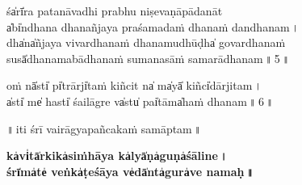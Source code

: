 \documentclass[parskip, DIV=14]{scrartcl}
\begin{document}
śa̍rī̍ra patanāva॒dhi pra॒bhu॒ ni॒ṣeva॒ṇāpā॒da॒nāt\\
a̍bi̍ndhana dhanañja॒ya pra॒śama॒daṁ dha॒naṁ dandhana॒m\,। \\
dha̍na̍ñjaya vivardha॒naṁ dha॒na॒mu॒dhūḍha̍ go॒vardha॒naṁ \\
su॒sā̍dhanamabādha॒naṁ su॒ma॒na॒sāṁ samarādhana॒m\,॥\,5\,॥ \par 

\newpage 
oṁ nā̍sti̍ pi̍trārji̍taṁ ki॒ñcit na̍ ma̍yā̍ kiñci̍dārji॒ta॒m\,। \\
a̍sti̍ me̍ hasti̍ śailā॒gre va̍stu̍ pai̍tāma̍haṁ dha॒na॒m\,॥\,6\,॥ \par 
 
 \vspace{1cm}
 
\begin{center}
 ॥\,iti śrī॒ vairāgyapañcakaṁ samā॒ptam\,॥

\vspace{1cm}

\textbf{\large ka̍vi̍tā̍rkika̍siṁhā॒ya ka̍lyā̍ṇa̍guṇa̍śāli॒ne॒\,। \\
śrī̍ma̍te̍ veṅka̍ṭeśā॒ya ve̍dā̍nta̍gura̍ve na॒ma॒ḥ॒\,॥}

\end{center}
\end{document}
